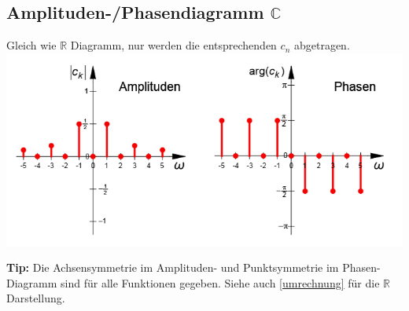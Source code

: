 \subsection{Amplituden-/Phasendiagramm $\mathbb{C}$}
Gleich wie $\mathbb{R}$ Diagramm, nur werden die entsprechenden $c_n$ abgetragen.\\
\includegraphics[width=\columnwidth]{Images/phasen_diagram_complex}

\noindent\textbf{Tip:} Die Achsensymmetrie im Amplituden- und Punktsymmetrie im Phasen-Diagramm sind für alle Funktionen gegeben. Siehe auch \ref{umrechnung} für die $\mathbb{R}$ Darstellung.